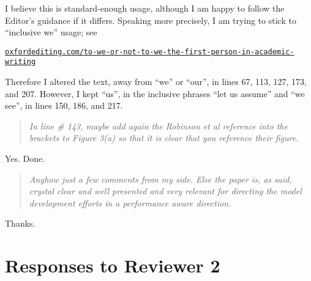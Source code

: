 \documentclass[letterpaper,final,12pt,reqno]{amsart}
\newenvironment{review}%
{\bigskip \par \begin{quote} \selectfont \sl}%
{\end{quote}}
\begin{document}
\noindent I believe this is standard-enough usage, although I am happy to follow the Editor's guidance if it differs.  Speaking more precisely, I am trying to stick to ``inclusive we'' usage; see

\medskip
{\footnotesize \href{https://oxfordediting.com/to-we-or-not-to-we-the-first-person-in-academic-writing/}{\texttt{oxfordediting.com/to-we-or-not-to-we-the-first-person-in-academic-writing}}}

\medskip
\noindent Therefore I altered the text, away from ``we'' or ``our'', in lines 67, 113, 127, 173, and 207.  However, I kept ``us'', in the inclusive phrases ``let us assume'' and ``we see'', in lines 150, 186, and 217.

\begin{review}
In line \# 143, maybe add again the Robinson et al reference into the brackets to Figure 3(a) so that it is clear that you reference their figure.
\end{review}

\noindent Yes.  Done.

\begin{review}
Anyhow just a few comments from my side. Else the paper is, as said, crystal clear and well presented and very relevant for directing the model development efforts in a performance aware direction.
\end{review}

Thanks.


\section{Responses to Reviewer 2}
\end{document}
